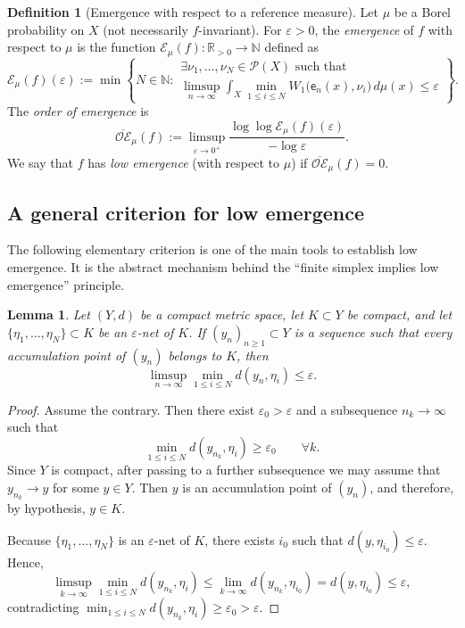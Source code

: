 \documentclass[12pt,a4paper,twoside]{article}
\theoremstyle{plain}
\newtheorem{lemma}[theorem]{Lemma}
\theoremstyle{definition}
\newtheorem{definition}[theorem]{Definition}
\newcommand{\R}{{\mathbb R}}
\newcommand{\N}{{\mathbb N}}
\newcommand{\cE}{{\mathcal E}}
\newcommand{\cP}{{\mathcal P}}
\newcommand{\eps}{\varepsilon}
\newcommand{\emp}{\mathsf e}
\newcommand{\Wone}{W_1}
\begin{document}
    
	\begin{definition}[Emergence with respect to a reference measure]
		Let $\mu$ be a Borel probability on $X$ (not necessarily $f$-invariant).
		For $\varepsilon>0$, the \emph{emergence} of $f$ with
		respect to $\mu$ is the function $\cE_\mu(f)\colon \R_{>0}\to \N$ defined as
		\[
		\cE_\mu(f)(\varepsilon)
		:= \min\left\{
		N\in\N :
		\begin{array}{l}
			\exists \nu_1,\dots,\nu_N\in\cP(X) \text{ such that} \\[0.2em]
			\displaystyle
			\limsup_{n\to\infty}
			\int_X
			\min_{1\le i\le N} \Wone \big(\emp_n(x),\nu_i\big)\, d\mu(x)
			\le \varepsilon
		\end{array}
		\right\}.
		\]
		The \emph{order of emergence} is
		\[
		\overline{\mathcal{OE}}_\mu(f)
		:= \limsup_{\varepsilon\to0^+}
		\frac{\log\log\cE_\mu(f)(\varepsilon)}{-\log\varepsilon}.
		\]
		We say that $f$ has \emph{low emergence} (with respect to $\mu$)
		if $\overline{\mathcal{OE}}_\mu(f)=0$.
	\end{definition}

	\subsection{A general criterion for low emergence}
	
	The following elementary criterion is one of the main tools to establish low emergence. It is the abstract mechanism behind the ``finite simplex implies low emergence'' principle.
	
	\begin{lemma}\label{lem:compact-family}
	Let $(Y,d)$ be a compact metric space, let $K\subset Y$ be compact,
	and let $\{\eta_1,\dots,\eta_N\}\subset K$ be an $\eps$-net of $K$.
	If $(y_n)_{n\ge1}\subset Y$ is a sequence such that every accumulation
	point of $(y_n)$ belongs to $K$, then
	\[
	\limsup_{n\to\infty}
	\min_{1\le i\le N} d(y_n,\eta_i)
	\le \eps.
	\]
\end{lemma}

\begin{proof}
	Assume the contrary. Then there exist $\eps_0>\eps$ and a subsequence $n_k\to\infty$ such that
	\[
	\min_{1\le i\le N}d(y_{n_k},\eta_i)\ge \eps_0
	\qquad\forall k.
	\]
	Since $Y$ is compact, after passing to a further subsequence we may
	assume that $y_{n_k}\to y$ for some $y\in Y$. Then $y$ is an accumulation point of $(y_n)$, and therefore, by hypothesis, $y\in K$.
	
    Because $\{\eta_1,\dots,\eta_N\}$ is an $\eps$-net of $K$, there exists $i_0$ such that $d(y,\eta_{i_0})\le\eps$. Hence,
	\[
	\limsup_{k\to\infty}
	\min_{1\le i\le N}d(y_{n_k},\eta_i)
	\le
	\lim_{k\to\infty}d(y_{n_k},\eta_{i_0})
	=
	d(y,\eta_{i_0})
	\le\eps,
	\]
	contradicting $\min_{1\le i\le N}d(y_{n_k},\eta_i)\ge\eps_0>\eps$.
\end{proof}
	
\end{document}
